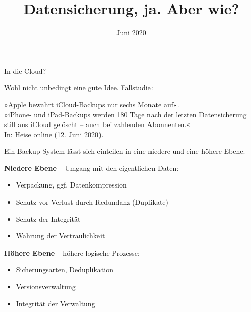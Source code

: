 \documentclass{beamer}
\title{Datensicherung, ja. Aber wie?}
\date{Juni 2020}
\newcommand{\strong}[1]{\textsf{\textbf{#1}}}
\begin{document}
\begin{frame}
\maketitle
\end{frame}

\begin{frame}[t]
\vspace{3em}
In die Cloud?\pause

\vspace{1em}
Wohl nicht unbedingt eine gute Idee. Fallstudie:

\vspace{1em}
»Apple bewahrt iCloud-Backups nur sechs Monate auf«.\\
{\footnotesize »iPhone- und iPad-Backups werden 180 Tage nach der letzten
Datensicherung still aus iCloud gelöscht -- auch bei zahlenden Abonnenten.«}\\
In: Heise online (12. Juni 2020).\\
{\tiny\href{https://www.heise.de/news/Apple-bewahrt-iCloud-Backups-nur-sechs-Monate-auf-4782483.html}%
{\color{urlcolor}{https://www.heise.de/news/Apple-bewahrt-iCloud-Backups-nur-sechs-Monate-auf-4782483.html}}}
\end{frame}

\begin{frame}
Ein Backup-System lässt sich einteilen in eine niedere und eine
höhere Ebene.\pause

\vspace{1em}
\strong{Niedere Ebene} -- Umgang mit den eigentlichen Daten:
\begin{itemize}
\item Verpackung, ggf. Datenkompression
\item Schutz vor Verlust durch Redundanz (Duplikate)
\item Schutz der Integrität
\item Wahrung der Vertraulichkeit
\end{itemize}\pause

\vspace{1em}
\strong{Höhere Ebene} -- höhere logische Prozesse:
\begin{itemize}
\item Sicherungsarten, Deduplikation
\item Versionsverwaltung
\item Integrität der Verwaltung
\end{itemize}
\end{frame}
\end{document}
